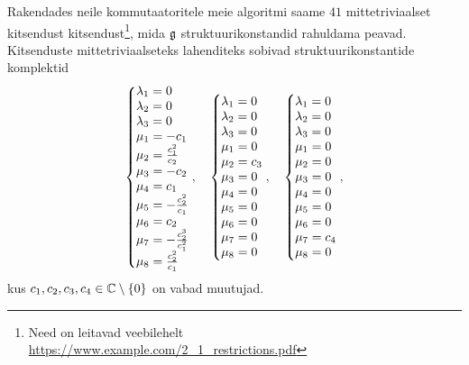 Rakendades neile kommutaatoritele meie algoritmi saame $41$
mittetriviaalset kitsendust kitsendust\footnote{Need on leitavad veebilehelt
\url{https://www.example.com/2_1_restrictions.pdf}},
mida $\mathfrak{g}$ struktuurikonstandid rahuldama peavad. Kitsenduste
mittetriviaalseteks lahenditeks sobivad struktuurikonstantide komplektid
\renewcommand\arraystretch{1.3}
\begin{align*}
    \left\{ \begin{matrix*}[l]
        \l_1 = 0 \\
        \l_2 = 0 \\
        \l_3 = 0 \\
        \m_1 = -c_1 \\
        \m_2 = \frac{c_1^2}{c_2} \\
        \m_3 = -c_2 \\
        \m_4 = c_1 \\
        \m_5 = -\frac{c_2^2}{c_1} \\
        \m_6 = c_2 \\
        \m_7 = -\frac{c_2^3}{c_1^2} \\
        \m_8 = \frac{c_2^2}{c_1} \\
    \end{matrix*} \right.,
    \quad
    \left\{ \begin{matrix*}[l]
        \l_1 = 0 \\
        \l_2 = 0 \\
        \l_3 = 0 \\
        \m_1 = 0 \\
        \m_2 = c_3 \\
        \m_3 = 0 \\
        \m_4 = 0 \\
        \m_5 = 0 \\
        \m_6 = 0 \\
        \m_7 = 0 \\
        \m_8 = 0 \\
    \end{matrix*} \right.,
    \quad
    \left\{ \begin{matrix*}[l]
        \l_1 = 0 \\
        \l_2 = 0 \\
        \l_3 = 0 \\
        \m_1 = 0 \\
        \m_2 = 0 \\
        \m_3 = 0 \\
        \m_4 = 0 \\
        \m_5 = 0 \\
        \m_6 = 0 \\
        \m_7 = c_4 \\
        \m_8 = 0 \\
    \end{matrix*} \right.,
\end{align*}
\renewcommand\arraystretch{1}
kus $c_1, c_2, c_3, c_4 \in \mathbb{C} \setminus \{0\}$ on vabad muutujad.

